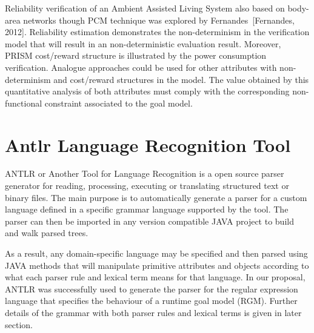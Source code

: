 Reliability verification of an Ambient Assisted Living System also based on body-area networks though PCM technique was explored by Fernandes~[Fernandes, 2012]. Reliability estimation demonstrates the non-determinism in the verification model that will result in an non-deterministic evaluation result. Moreover, PRISM cost/reward structure is illustrated by the power consumption verification. Analogue approaches could be used for other attributes with non-determinism and cost/reward structures in the model. The value obtained by this quantitative analysis of both attributes must comply with the corresponding non-functional constraint associated to the goal model.


\section{Antlr Language Recognition Tool}

ANTLR or Another Tool for Language Recognition is a open source parser generator for reading, processing, executing or translating structured text or binary files. The main purpose is to automatically generate a parser for a custom language defined in a specific grammar language supported by the tool. The parser can then be imported in any version compatible JAVA project to build and walk parsed trees. 

As a result, any domain-specific language may be specified and then parsed using JAVA methods that will manipulate primitive attributes and objects according to what each parser rule and lexical term means for that language. In our proposal, ANTLR was successfully used to generate the parser for the regular expression language that specifies the behaviour of a runtime goal model (RGM). Further details of the grammar with both parser rules and lexical terms is given in later section.

